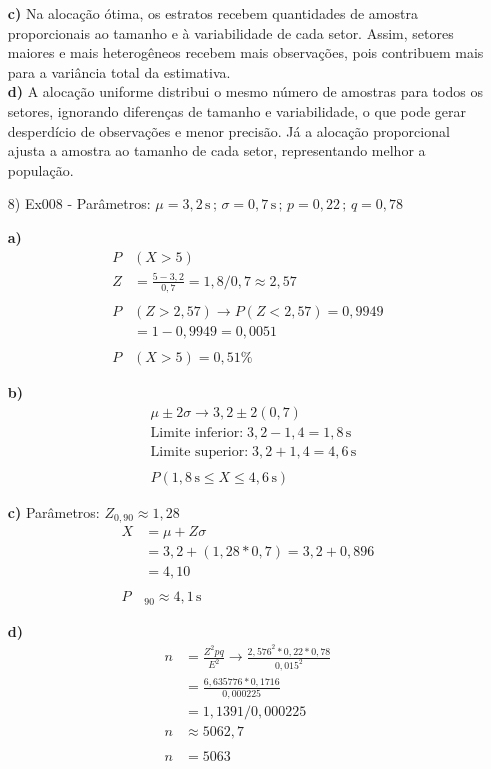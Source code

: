 \documentclass[fleqn, 12pt]{article}
\begin{document}
\begin{itemize}
\textbf{c)}
Na alocação ótima, os estratos recebem quantidades de amostra proporcionais ao tamanho e à variabilidade de cada setor. Assim, setores maiores e mais heterogêneos recebem mais observações, pois contribuem mais para a variância total da estimativa.\\

\textbf{d)}
A alocação uniforme distribui o mesmo número de amostras para todos os setores, ignorando diferenças de tamanho e variabilidade, o que pode gerar desperdício de observações e menor precisão. Já a alocação proporcional ajusta a amostra ao tamanho de cada setor, representando melhor a população.

\newpage
\item[8)] Ex008 - Parâmetros: $\mu=3,2\,\text{s}\,;\,\sigma=0,7\,\text{s}\,;\,p=0,22\,;\,q=0,78$

\textbf{a)}
\begin{align*}
    P&(X>5)\\
    Z&=\frac{5-3,2}{0,7} = 1,8/0,7\approx2,57\\\\
    P&(Z>2,57) \rightarrow P(Z<2,57) = 0,9949\\
    &=1-0,9949 =0,0051\\\\
    P&(X>5)=0,51\%
\end{align*}

\textbf{b)}
\begin{align*}
    &\mu\pm2\sigma \rightarrow 3,2\pm2(0,7)\\
    &\text{Limite inferior:}\;3,2-1,4=1,8\,\text{s}\\
    &\text{Limite superior:}\;3,2+1,4=4,6\,\text{s}\\\\
    &P(1,8\,\text{s}\leq X\leq4,6\,\text{s})
\end{align*}

\textbf{c)}
Parâmetros: $Z_{0,90}\approx1,28$\\
\begin{align*}
    X&=\mu+Z\sigma\\
    &=3,2+(1,28*0,7) =3,2+0,896\\
    &=4,10\\\\
    P&_{90}\approx4,1\,\text{s}
\end{align*}

\textbf{d)}
\begin{align*}
    n&=\frac{Z^2pq}{E^2} \rightarrow \frac{2,576^2*0,22*0,78}{0,015^2}\\
    &=\frac{6,635776*0,1716}{0,000225}\\
    &=1,1391/0,000225\\
    n&\approx5062,7\\\\
    n&=5063
\end{align*}


\end{itemize}
\end{document}
